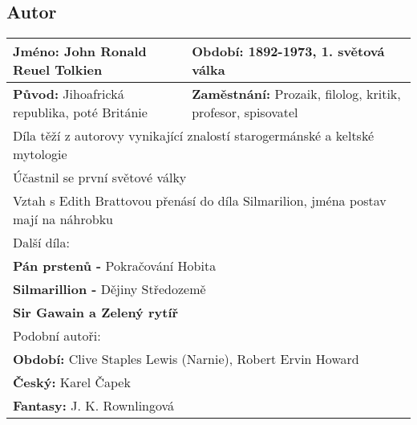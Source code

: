 \subsection*{Autor}
\begin{tabularx}{\linewidth}{l|l}
  \textbf{Jméno:} John Ronald Reuel Tolkien            & \textbf{Období:} 1892-1973, 1. světová válka                        \\
  \hline
  \textbf{Původ:} Jihoafrická republika, poté Británie & \textbf{Zaměstnání:} Prozaik, filolog, kritik, profesor, spisovatel \\
  \hline
  \multicolumn{2}{l}{Díla těží z autorovy vynikající znalostí starogermánské a keltské mytologie}                            \\
  \multicolumn{2}{l}{Účastnil se první světové války}                                                                        \\
  \multicolumn{2}{l}{Vztah s Edith Brattovou přenásí do díla Silmarilion, jména postav mají na náhrobku}                     \\
  \hline
  \multicolumn{2}{l}{Další díla:}                                                                                            \\
  \multicolumn{2}{l}{\textbf{Pán prstenů -} Pokračování Hobita}                                                              \\
  \multicolumn{2}{l}{\textbf{Silmarillion -} Dějiny Středozemě}                                                              \\
  \multicolumn{2}{l}{\textbf{Sir Gawain a Zelený rytíř}}                                                                     \\
  \hline
  \multicolumn{2}{l}{Podobní autoři:}                                                                                        \\
  \multicolumn{2}{l}{\textbf{Období:} Clive Staples Lewis (Narnie), Robert Ervin Howard}                                     \\
  \multicolumn{2}{l}{\textbf{Český:} Karel Čapek}                                                                            \\
  \multicolumn{2}{l}{\textbf{Fantasy:} J. K. Rownlingová}                                                                    \\
\end{tabularx}

